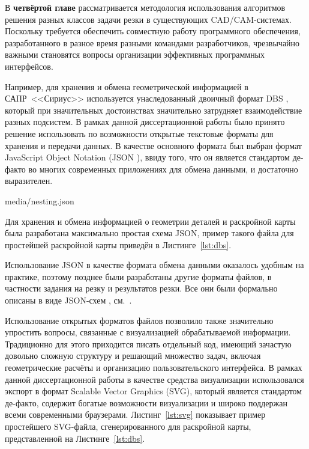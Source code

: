 
В {\bf четвёртой главе}
рассматривается методология
использования алгоритмов решения
разных классов задачи резки в существующих
CAD/CAM-системах.
Поскольку требуется обеспечить
совместную работу программного обеспечения,
разработанного в разное время разными командами разработчиков,
чрезвычайно важными становятся вопросы
организации эффективных программных интерфейсов.

Например, для хранения и обмена геометрической информацией
в САПР~<<Сириус>>
используется унаследованный двоичный формат DBS
\cite{bi:DBS},
который при значительных достоинствах
значительно затрудняет взаимодействие разных подсистем.
В рамках данной диссертационной работы
было принято решение использовать по возможности
открытые текстовые форматы для хранения и передачи данных.
В качестве основного формата был выбран формат
JavaScript Object Notation
(JSON
\autocite{bi:JSON}),
ввиду того, что
он
является стандартом де-факто во многих
современных приложениях для обмена данными,
и достаточно выразителен.


    {media/nesting.json}

Для хранения и обмена информацией о геометрии деталей
и раскройной карты
была разработана максимально простая схема JSON,
пример такого файла для простейшей раскройной карты
приведён в Листинге~\ref{lst:dbs}.

Использование JSON
в качестве формата обмена данными
оказалось удобным на практике,
поэтому позднее были разработаны другие
форматы файлов, в частности
задания на резку и результатов резки.
Все они были формально описаны в
виде JSON-схем
\autocite*[]{bi:json-schema},
см.~\cite{bi:dbs-schema}.

Использование открытых форматов файлов позволило
также значительно упростить вопросы,
связанные с визуализацией обрабатываемой информации.
Традиционно для этого приходится
писать отдельный код,
имеющий зачастую довольно сложную структуру и решающий
множество задач, включая геометрические расчёты
и организацию пользовательского интерфейса.
В рамках данной диссертационной работы
в качестве средства визуализации
использовался экспорт в формат
Scalable Vector Graphics
(SVG),
который является стандартом де-факто,
содержит богатые возможности визуализации
и широко поддержан всеми современными браузерами.
Листинг~\ref{lst:svg}
показывает пример простейшего SVG-файла,
сгенерированного для раскройной карты,
представленной на Листинге~\ref{lst:dbs}.

